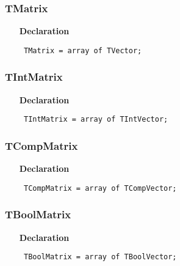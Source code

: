 \documentclass[12pt,a4paper,oneside]{report}
\newcommand{\declarationitem}[1]{\textbf{#1}}
\newcommand{\code}[1]{\texttt{#1}}
\begin{document}
\subsubsection{TMatrix}
\label{utypes-TMatrix}
\begin{itemize}\item[\declarationitem{Declaration}\hfill]
	\begin{flushleft}
		\code{
			TMatrix     = array of TVector;}
		
	\end{flushleft}
	
\end{itemize}
\subsubsection{TIntMatrix}
\label{utypes-TIntMatrix}
\begin{itemize}\item[\declarationitem{Declaration}\hfill]
	\begin{flushleft}
		\code{
			TIntMatrix  = array of TIntVector;}
		
	\end{flushleft}
	
\end{itemize}
\subsubsection{TCompMatrix}
\label{utypes-TCompMatrix}
\begin{itemize}\item[\declarationitem{Declaration}\hfill]
	\begin{flushleft}
		\code{
			TCompMatrix = array of TCompVector;}
		
	\end{flushleft}
	
\end{itemize}
\subsubsection{TBoolMatrix}
\label{utypes-TBoolMatrix}
\begin{itemize}\item[\declarationitem{Declaration}\hfill]
	\begin{flushleft}
		\code{
			TBoolMatrix = array of TBoolVector;}
		
	\end{flushleft}
	
\end{itemize}
\end{document}
